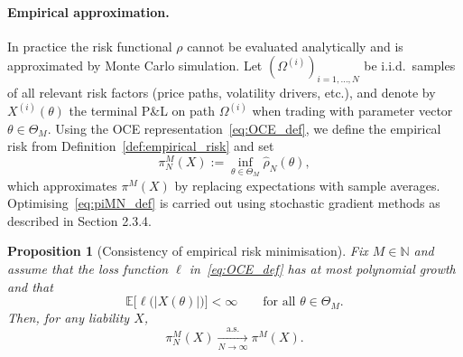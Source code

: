 \documentclass[12pt,a4paper]{article}
\theoremstyle{definition}
\theoremstyle{plain}
\newtheorem{proposition}{Proposition}[section]
\theoremstyle{remark}
\theoremstyle{plain}
\begin{document}
\paragraph{Empirical approximation.}
In practice the risk functional $\rho$ cannot be evaluated analytically and is approximated by Monte Carlo simulation.
Let $(\Omega^{(i)})_{i=1,\dots,N}$ be i.i.d.\ samples of all relevant risk factors (price paths, volatility drivers, etc.), and denote by $X^{(i)}(\theta)$ the terminal P\&L on path $\Omega^{(i)}$ when trading with parameter vector $\theta\in\Theta_M$.
Using the OCE representation~\eqref{eq:OCE_def}, we define the empirical risk from Definition~\ref{def:empirical_risk} and set
\begin{equation}
\pi^{M}_N(X)
:=
\inf_{\theta\in\Theta_M}
\widehat{\rho}_N(\theta),
\label{eq:piMN_def}
\end{equation}
which approximates $\pi^{M}(X)$ by replacing expectations with sample averages.
Optimising~\eqref{eq:piMN_def} is carried out using stochastic gradient methods as described in Section 2.3.4.

\begin{proposition}[Consistency of empirical risk minimisation]
\label{prop:empirical_consistency}
Fix $M\in\mathbb N$ and assume that the loss function $\ell$ in~\eqref{eq:OCE_def} has at most polynomial growth and that
\[
\mathbb{E}\bigl[\ell\bigl(|X(\theta)|\bigr)\bigr] < \infty
\qquad\text{for all }\theta\in\Theta_M.
\]
Then, for any liability $X$,
\[
\pi^{M}_N(X) \xrightarrow[N\to\infty]{\text{a.s.}} \pi^{M}(X).
\]
\end{proposition}
\end{document}
